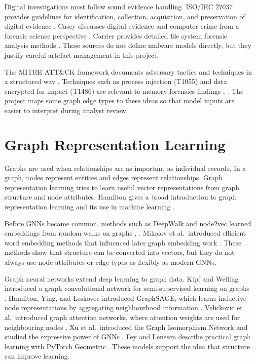 Digital investigations must follow sound evidence handling. ISO/IEC 27037 provides guidelines for identification, collection, acquisition, and preservation of digital evidence \cite{iso2012digital}. Casey discusses digital evidence and computer crime from a forensic science perspective \cite{casey2011digital}. Carrier provides detailed file system forensic analysis methods \cite{carrier2005filesystem}. These sources do not define malware models directly, but they justify careful artefact management in this project.

The MITRE ATT\&CK framework documents adversary tactics and techniques in a structured way \cite{mitre2026enterprise}. Techniques such as process injection (T1055) and data encrypted for impact (T1486) are relevant to memory-forensics findings \cite{mitre2026t1055}, \cite{mitre2026t1486}. The project maps some graph edge types to these ideas so that model inputs are easier to interpret during analyst review.

\section{Graph Representation Learning}

Graphs are used when relationships are as important as individual records. In a graph, nodes represent entities and edges represent relationships. Graph representation learning tries to learn useful vector representations from graph structure and node attributes. Hamilton gives a broad introduction to graph representation learning and its use in machine learning \cite{hamilton2020graph}.

Before GNNs became common, methods such as DeepWalk and node2vec learned embeddings from random walks on graphs \cite{perozzi2014deepwalk}, \cite{grover2016node2vec}. Mikolov et al.\ introduced efficient word embedding methods that influenced later graph embedding work \cite{mikolov2013word}. These methods show that structure can be converted into vectors, but they do not always use node attributes or edge types as flexibly as modern GNNs.

Graph neural networks extend deep learning to graph data. Kipf and Welling introduced a graph convolutional network for semi-supervised learning on graphs \cite{kipf2017gcn}. Hamilton, Ying, and Leskovec introduced GraphSAGE, which learns inductive node representations by aggregating neighbourhood information \cite{hamilton2017graphsage}. Velickovic et al.\ introduced graph attention networks, where attention weights are used for neighbouring nodes \cite{velickovic2018gat}. Xu et al.\ introduced the Graph Isomorphism Network and studied the expressive power of GNNs \cite{xu2019gin}. Fey and Lenssen describe practical graph learning with PyTorch Geometric \cite{fey2019pyg}. These models support the idea that structure can improve learning.

